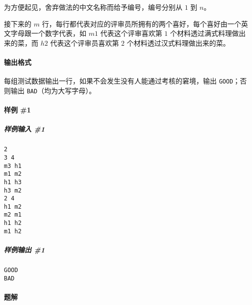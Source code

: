 \documentclass[]{article}
\let\oldparagraph\paragraph
\renewcommand{\paragraph}[1]{\oldparagraph{#1}\mbox{}}
\let\oldsubparagraph\subparagraph
\renewcommand{\subparagraph}[1]{\oldsubparagraph{#1}\mbox{}}
\begin{document}
为方便起见，舍弃做法的中文名称而给予编号，编号分别从 \(1\) 到 \(n\)。

接下来的 \(m\)
行，每行都代表对应的评审员所拥有的两个喜好，每个喜好由一个英文字母跟一个数字代表，如
\(m1\) 代表这个评审喜欢第 \(1\) 个材料透过满式料理做出来的菜，而 \(h2\)
代表这个评审员喜欢第 \(2\) 个材料透过汉式料理做出来的菜。

\hypertarget{ux8f93ux51faux683cux5f0f-2}{%
\paragraph{输出格式}\label{ux8f93ux51faux683cux5f0f-2}}

每组测试数据输出一行，如果不会发生没有人能通过考核的窘境，输出
\texttt{GOOD}；否则输出 \texttt{BAD}（均为大写字母）。

\hypertarget{ux6837ux4f8b-1-2}{%
\paragraph{样例 \#1}\label{ux6837ux4f8b-1-2}}

\hypertarget{ux6837ux4f8bux8f93ux5165-1-2}{%
\subparagraph{样例输入 \#1}\label{ux6837ux4f8bux8f93ux5165-1-2}}

\begin{verbatim}
2
3 4
m3 h1
m1 m2
h1 h3
h3 m2
2 4
h1 m2
m2 m1
h1 h2
m1 h2
\end{verbatim}

\hypertarget{ux6837ux4f8bux8f93ux51fa-1-2}{%
\subparagraph{样例输出 \#1}\label{ux6837ux4f8bux8f93ux51fa-1-2}}

\begin{verbatim}
GOOD
BAD
\end{verbatim}

\hypertarget{ux9898ux89e3-2}{%
\paragraph{题解}\label{ux9898ux89e3-2}}
\end{document}
